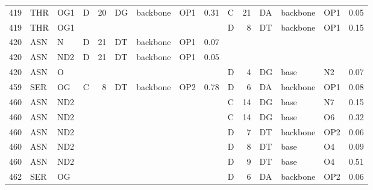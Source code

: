 \begin{longtable}{rlllrlllrlrlllr}
       419 & THR        & OG1    & D         &          20 & DG           & backbone    & OP1      &          0.31 & C         &          21 & DA           & backbone    & OP1      &          0.05 \\
       419 & THR        & OG1    &        &          &           &          &       &            & D         &           8 & DT           & backbone    & OP1      &          0.15 \\
       420 & ASN        & N      & D         &          21 & DT           & backbone    & OP1      &          0.07 &        &          &           &          &       &            \\
       420 & ASN        & ND2    & D         &          21 & DT           & backbone    & OP1      &          0.05 &        &          &           &          &       &            \\
       420 & ASN        & O      &        &          &           &          &       &            & D         &           4 & DG           & base        & N2       &          0.07 \\
       459 & SER        & OG     & C         &           8 & DT           & backbone    & OP2      &          0.78 & D         &           6 & DA           & backbone    & OP1      &          0.08 \\
       460 & ASN        & ND2    &        &          &           &          &       &            & C         &          14 & DG           & base        & N7       &          0.15 \\
       460 & ASN        & ND2    &        &          &           &          &       &            & C         &          14 & DG           & base        & O6       &          0.32 \\
       460 & ASN        & ND2    &        &          &           &          &       &            & D         &           7 & DT           & backbone    & OP2      &          0.06 \\
       460 & ASN        & ND2    &        &          &           &          &       &            & D         &           8 & DT           & base        & O4       &          0.09 \\
       460 & ASN        & ND2    &        &          &           &          &       &            & D         &           9 & DT           & base        & O4       &          0.51 \\
       462 & SER        & OG     &        &          &           &          &       &            & D         &           6 & DA           & backbone    & OP2      &          0.06 \\

\end{longtable}
